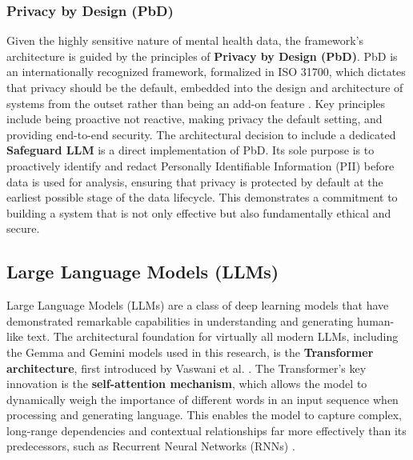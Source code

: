 \subsubsection{Privacy by Design (PbD)}
Given the highly sensitive nature of mental health data, the framework's architecture is guided by the principles of \textbf{Privacy by Design (PbD)}. PbD is an internationally recognized framework, formalized in ISO 31700, which dictates that privacy should be the default, embedded into the design and architecture of systems from the outset rather than being an add-on feature \cite{FIND_CITATION_PLEASE}. Key principles include being proactive not reactive, making privacy the default setting, and providing end-to-end security. The architectural decision to include a dedicated \textbf{Safeguard LLM} is a direct implementation of PbD. Its sole purpose is to proactively identify and redact Personally Identifiable Information (PII) before data is used for analysis, ensuring that privacy is protected by default at the earliest possible stage of the data lifecycle. This demonstrates a commitment to building a system that is not only effective but also fundamentally ethical and secure.


\subsection{Large Language Models (LLMs)}
\label{subsec:llms}

Large Language Models (LLMs) are a class of deep learning models that have demonstrated remarkable capabilities in understanding and generating human-like text. The architectural foundation for virtually all modern LLMs, including the Gemma and Gemini models used in this research, is the \textbf{Transformer architecture}, first introduced by Vaswani et al. \cite{FIND_CITATION_PLEASE}. The Transformer's key innovation is the \textbf{self-attention mechanism}, which allows the model to dynamically weigh the importance of different words in an input sequence when processing and generating language. This enables the model to capture complex, long-range dependencies and contextual relationships far more effectively than its predecessors, such as Recurrent Neural Networks (RNNs) \cite{FIND_CITATION_PLEASE}.

